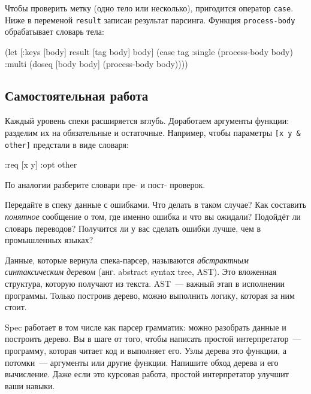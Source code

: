Чтобы проверить метку (одно тело или несколько), пригодится оператор
\verb|case|. Ниже в переменой \verb|result| записан результат
парсинга. Функция \verb|process-body| обрабатывает словарь тела:

\begin{english}
  \begin{clojure}
(let [{:keys [body]} result
      [tag body] body]
  (case tag
    :single
    (process-body body)
    :multi
    (doseq [body body]
      (process-body body))))
  \end{clojure}
\end{english}

\subsection{Самостоятельная работа}


Каждый уровень спеки расширяется вглубь. Доработаем аргументы функции: разделим
их на обязательные и остаточные. Например, чтобы параметры \verb|[x y & other]|
предстали в виде словаря:

\begin{english}
  \begin{clojure}
{:req [x y] :opt other}
  \end{clojure}
\end{english}

\noindent
По аналогии разберите словари пре- и пост- проверок.

Передайте в спеку данные с ошибками. Что делать в таком случае? Как составить
\emph{понятное} сообщение о том, где именно ошибка и что вы ожидали? Подойдёт ли
словарь переводов? Получится ли у вас сделать ошибки лучше, чем в промышленных
языках?

Данные, которые вернула спека-парсер, называются \emph{абстрактным синтаксическим деревом}
(анг. abstract syntax tree, AST).
Это вложенная структура, которую получают из текста. AST~--- важный этап в исполнении
программы. Только построив дерево, можно выполнить логику, которая за ним стоит.


Spec работает в том числе как парсер грамматик: можно разобрать данные и
построить дерево. Вы в шаге от того, чтобы написать простой интерпретатор~---
программу, которая читает код и выполняет его. Узлы дерева это функции, а
потомки~--- аргументы или другие функции. Напишите обход дерева и его
вычисление. Даже если это курсовая работа, простой интерпретатор улучшит ваши
навыки.

